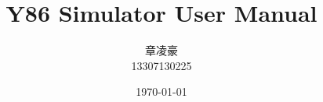 \documentclass[12pt]{article}
\begin{document}
\pagestyle{fancy}
\lhead{\textbf{{\thetitle}}}
\rhead{\textbf{\nouppercase{\firstleftmark}}}
\cfoot{\thepage}

\title{\textbf{Y86 Simulator User Manual}}
\author{章凌豪\\13307130225}
\date{\today}
\maketitle

\tableofcontents
\clearpage

\end{document}
